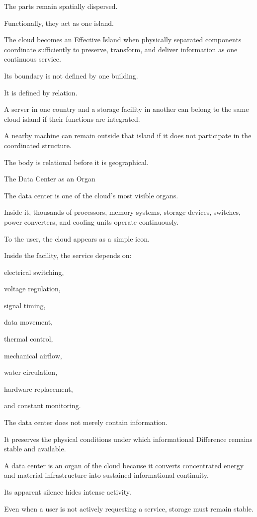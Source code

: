 The parts remain spatially dispersed.

Functionally, they act as one island.

The cloud becomes an Effective Island when physically separated components coordinate sufficiently to preserve, transform, and deliver information as one continuous service.

Its boundary is not defined by one building.

It is defined by relation.

A server in one country and a storage facility in another can belong to the same cloud island if their functions are integrated.

A nearby machine can remain outside that island if it does not participate in the coordinated structure.

The body is relational before it is geographical.

The Data Center as an Organ

The data center is one of the cloud’s most visible organs.

Inside it, thousands of processors, memory systems, storage devices, switches, power converters, and cooling units operate continuously.

To the user, the cloud appears as a simple icon.

Inside the facility, the service depends on:

electrical switching,

voltage regulation,

signal timing,

data movement,

thermal control,

mechanical airflow,

water circulation,

hardware replacement,

and constant monitoring.

The data center does not merely contain information.

It preserves the physical conditions under which informational Difference remains stable and available.

A data center is an organ of the cloud because it converts concentrated energy and material infrastructure into sustained informational continuity.

Its apparent silence hides intense activity.

Even when a user is not actively requesting a service, storage must remain stable.

